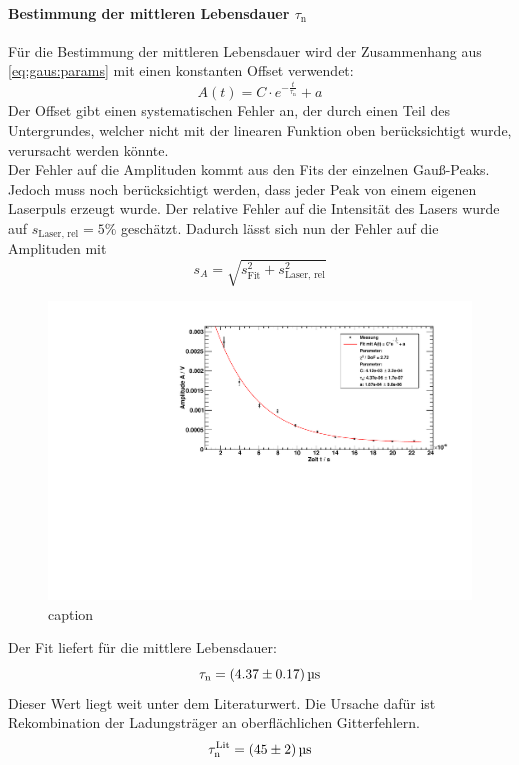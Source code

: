 \paragraph{Bestimmung der mittleren Lebensdauer $\tau_\text{n}$}
Für die Bestimmung der mittleren Lebensdauer wird der Zusammenhang aus \autoref{eq:gaus:params} mit einen konstanten Offset verwendet:
\begin{equation}
  A(t) = C \cdot e^{- \frac{t}{\tau_\text{n}}} + a
\end{equation}
Der Offset gibt einen systematischen Fehler an, der durch einen Teil des Untergrundes, welcher nicht mit der linearen Funktion oben 
berücksichtigt wurde, verursacht werden könnte. \\
Der Fehler auf die Amplituden kommt aus den Fits der einzelnen Gauß-Peaks. Jedoch muss noch berücksichtigt werden, dass jeder Peak von einem 
eigenen Laserpuls erzeugt wurde. Der relative Fehler auf die Intensität des Lasers wurde auf $s_\text{Laser, rel} = 5\%$ geschätzt. Dadurch 
lässt sich nun der Fehler auf die Amplituden mit 
\begin{equation}
  s_A = \sqrt{s_\text{Fit}^2 + s_\text{Laser, rel}^2}
\end{equation}
\begin{figure}[H]
\begin{center}
  \includegraphics[width=\textwidth]{../img/part2/dist_fitA.pdf}
  \caption{caption}
  \label{img:dist:fita}
\end{center}
\end{figure}
Der Fit liefert für die mittlere Lebensdauer:
\begin{equation}
  \tau_\text{n} = (4.37 \pm 0.17)\,\text{\textmu s}
\end{equation}
Dieser Wert liegt weit unter dem Literaturwert. Die Ursache dafür ist Rekombination der Ladungsträger an oberflächlichen Gitterfehlern.
\begin{equation}
  \tau_\text{n}^\text{Lit} = (45 \pm 2)\,\text{\textmu s}
\end{equation}


